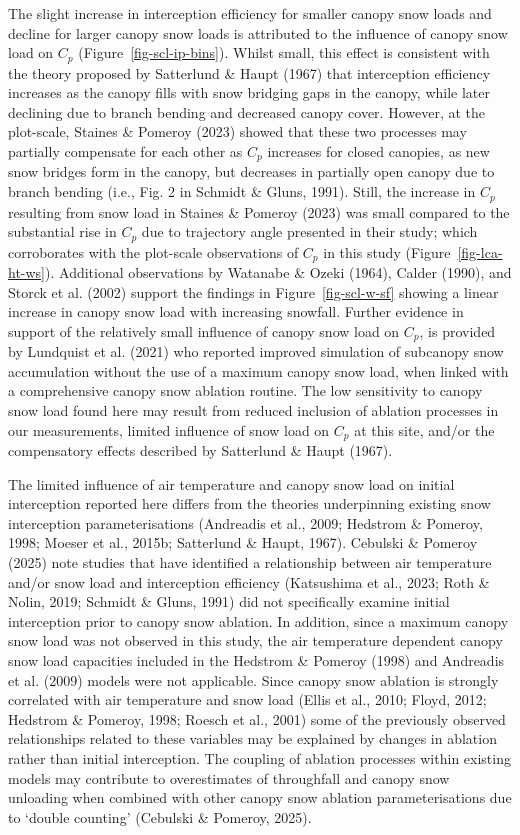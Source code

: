 \documentclass[
  letterpaper,
  DIV=11,
  numbers=noendperiod]{scrartcl}
\begin{document}
The slight increase in interception efficiency for smaller canopy snow
loads and decline for larger canopy snow loads is attributed to the
influence of canopy snow load on \(C_p\) (Figure~\ref{fig-scl-ip-bins}).
Whilst small, this effect is consistent with the theory proposed by
Satterlund \& Haupt (1967) that interception efficiency increases as the
canopy fills with snow bridging gaps in the canopy, while later
declining due to branch bending and decreased canopy cover. However, at
the plot-scale, Staines \& Pomeroy (2023) showed that these two
processes may partially compensate for each other as \(C_p\) increases
for closed canopies, as new snow bridges form in the canopy, but
decreases in partially open canopy due to branch bending (i.e., Fig. 2
in Schmidt \& Gluns, 1991). Still, the increase in \(C_p\) resulting
from snow load in Staines \& Pomeroy (2023) was small compared to the
substantial rise in \(C_p\) due to trajectory angle presented in their
study; which corroborates with the plot-scale observations of \(C_p\) in
this study (Figure~\ref{fig-lca-ht-ws}). Additional observations by
Watanabe \& Ozeki (1964), Calder (1990), and Storck et al. (2002)
support the findings in Figure~\ref{fig-scl-w-sf} showing a linear
increase in canopy snow load with increasing snowfall. Further evidence
in support of the relatively small influence of canopy snow load on
\(C_p\), is provided by Lundquist et al. (2021) who reported improved
simulation of subcanopy snow accumulation without the use of a maximum
canopy snow load, when linked with a comprehensive canopy snow ablation
routine. The low sensitivity to canopy snow load found here may result
from reduced inclusion of ablation processes in our measurements,
limited influence of snow load on \(C_p\) at this site, and/or the
compensatory effects described by Satterlund \& Haupt (1967).

The limited influence of air temperature and canopy snow load on initial
interception reported here differs from the theories underpinning
existing snow interception parameterisations (Andreadis et al., 2009;
Hedstrom \& Pomeroy, 1998; Moeser et al., 2015b; Satterlund \& Haupt,
1967). Cebulski \& Pomeroy (2025) note studies that have identified a
relationship between air temperature and/or snow load and interception
efficiency (Katsushima et al., 2023; Roth \& Nolin, 2019; Schmidt \&
Gluns, 1991) did not specifically examine initial interception prior to
canopy snow ablation. In addition, since a maximum canopy snow load was
not observed in this study, the air temperature dependent canopy snow
load capacities included in the Hedstrom \& Pomeroy (1998) and Andreadis
et al. (2009) models were not applicable. Since canopy snow ablation is
strongly correlated with air temperature and snow load (Ellis et al.,
2010; Floyd, 2012; Hedstrom \& Pomeroy, 1998; Roesch et al., 2001) some
of the previously observed relationships related to these variables may
be explained by changes in ablation rather than initial interception.
The coupling of ablation processes within existing models may contribute
to overestimates of throughfall and canopy snow unloading when combined
with other canopy snow ablation parameterisations due to `double
counting' (Cebulski \& Pomeroy, 2025).
\end{document}
